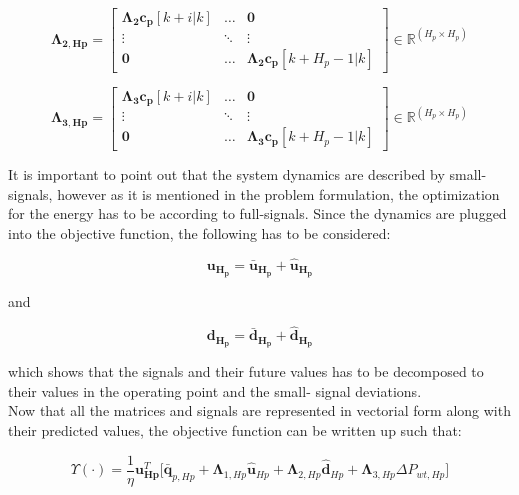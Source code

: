 \begin{equation}
\bm{\Lambda_{2,Hp}} =
 \begin{bmatrix}
 \bm{\Lambda_2} \bm{c_p}[k+i|k] & \hdots & \bm{0} \\
 \vdots & \ddots & \vdots\\
 \bm{0} & \hdots & \bm{\Lambda_2 c_p}[k+H_p-1|k] 
 \end{bmatrix}
 \in \pmb{\mathbb{R}}^{(H_p \times H_p)}
\end{equation} 


\begin{equation}
\bm{\Lambda_{3,Hp}} =
 \begin{bmatrix}
 \bm{\Lambda_3} \bm{c_p}[k+i|k] & \hdots & \bm{0} \\
 \vdots & \ddots & \vdots\\
 \bm{0} & \hdots & \bm{\Lambda_3 c_p}[k+H_p-1|k] 
 \end{bmatrix}
 \in \pmb{\mathbb{R}}^{(H_p \times H_p)}
\end{equation} 

It is important to point out that the system dynamics are described by small-signals, however as it is mentioned in the problem formulation, the optimization for the energy has to be according to full-signals. Since the dynamics are plugged into the objective function, the following has to be considered: 

\begin{equation}
\bm{u_{H_{p}}} = \bm{\bar{u}_{H_{p}}} + \bm{\hat{u}_{H_{p}}}
\label{u_pred}
\end{equation}

and

\begin{equation}
\bm{d_{H_{p}}} = \bm{\bar{d}_{H_{p}}} + \bm{\hat{d}_{H_{p}}}
\end{equation}

which shows that the signals and their future values has to be decomposed to their values in the operating point and the small- signal deviations. 
\\
Now that all the matrices and signals are represented in vectorial form along with their predicted values, the objective function can be written up such that:

\begin{equation}
  \Upsilon(\cdot) = \frac{1}{\eta} {\bm{{u}}}_{\bm{{Hp}}}^{T}\bigg[ {\bm{\bar{q}}}_{p,Hp} + {\bm{\Lambda}}_{1,Hp} {\bm{\hat{u}}}_{Hp} + {\bm{\Lambda}}_{2,Hp} {\bm{\hat{d}}}_{Hp} 
  + {\bm{\Lambda}}_{3,Hp} \Delta P_{wt,Hp} \bigg]
 \label{obj_hp}
\end{equation}

